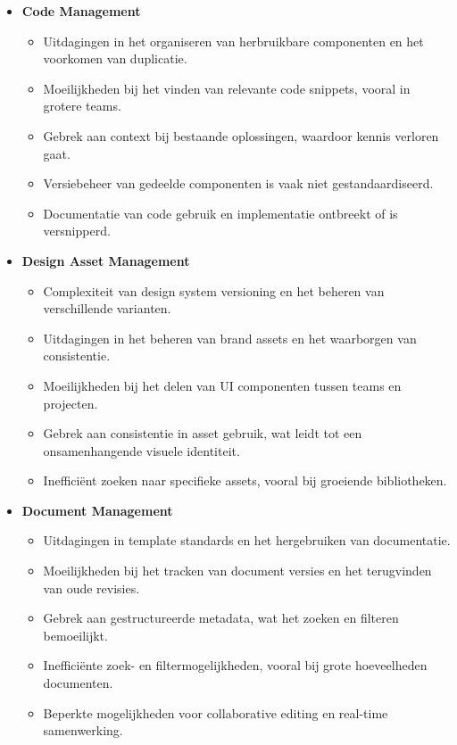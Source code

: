 \begin{itemize}
    \item \textbf{Code Management}
    \begin{itemize}
        \item Uitdagingen in het organiseren van herbruikbare componenten en het voorkomen van duplicatie.
        \item Moeilijkheden bij het vinden van relevante code snippets, vooral in grotere teams.
        \item Gebrek aan context bij bestaande oplossingen, waardoor kennis verloren gaat.
        \item Versiebeheer van gedeelde componenten is vaak niet gestandaardiseerd.
        \item Documentatie van code gebruik en implementatie ontbreekt of is versnipperd.
    \end{itemize}
    
    \item \textbf{Design Asset Management}
    \begin{itemize}
        \item Complexiteit van design system versioning en het beheren van verschillende varianten.
        \item Uitdagingen in het beheren van brand assets en het waarborgen van consistentie.
        \item Moeilijkheden bij het delen van UI componenten tussen teams en projecten.
        \item Gebrek aan consistentie in asset gebruik, wat leidt tot een onsamenhangende visuele identiteit.
        \item Inefficiënt zoeken naar specifieke assets, vooral bij groeiende bibliotheken.
    \end{itemize}
    
    \item \textbf{Document Management}
    \begin{itemize}
        \item Uitdagingen in template standards en het hergebruiken van documentatie.
        \item Moeilijkheden bij het tracken van document versies en het terugvinden van oude revisies.
        \item Gebrek aan gestructureerde metadata, wat het zoeken en filteren bemoeilijkt.
        \item Inefficiënte zoek- en filtermogelijkheden, vooral bij grote hoeveelheden documenten.
        \item Beperkte mogelijkheden voor collaborative editing en real-time samenwerking.
    \end{itemize}
\end{itemize}

